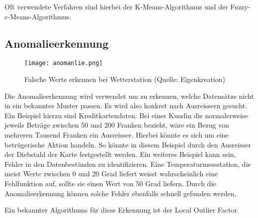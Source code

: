Oft verwendete Verfahren sind hierbei der K-Means-Algorithmus und der Fuzzy-c-Means-Algorithmus.

\subsection{Anomalieerkennung}
\begin{figure}[h!]
	\centering
	\texttt{[image: anomanlie.png]}
	\caption{Falsche Werte erkennen bei Wetterstation (Quelle: Eigenkreation)}
\end{figure}
Die Anomalieerkennung wird verwendet um zu erkennen, welche Datensätze nicht in ein bekanntes Muster passen. Es wird also konkret nach Ausreissern gesucht. Ein Beispiel hierzu sind Kreditkartendaten. Bei einer Kundin die normalerweise jeweils Beträge zwischen 50 und 200 Franken bezieht, wäre ein Bezug von mehreren Tausend Franken ein Ausreisser. Hierbei könnte es sich um eine betrügerische Aktion handeln. So könnte in diesem Beispiel durch den Ausreisser der Diebstahl der Karte festgestellt werden.
Ein weiteres Beispiel kann sein, Fehler in den Datenbeständen zu identifizieren. Eine Temperaturmessstation, die meist Werte zwischen 0 und 20 Grad liefert weisst wahrscheinlich eine Fehlfunktion auf, sollte sie einen Wert von 50 Grad liefern. Durch die Anomalieerkennung können solche Fehler ebenfalls schnell gefunden werden.

Ein bekannter Algorithums für diese Erkennung ist der Local Outlier Factor.

